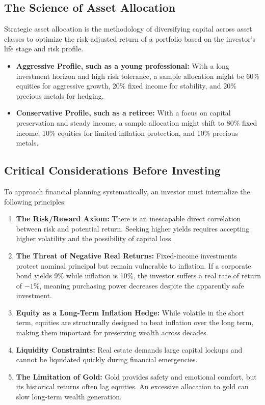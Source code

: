 \documentclass[12pt,openany]{book}
\begin{document}
\subsection{The Science of Asset Allocation}
Strategic asset allocation is the methodology of diversifying capital across asset classes to optimize the risk-adjusted return of a portfolio based on the investor's life stage and risk profile.

\begin{itemize}[leftmargin=*]
    \item \textbf{Aggressive Profile, such as a young professional:} With a long investment horizon and high risk tolerance, a sample allocation might be 60\% equities for aggressive growth, 20\% fixed income for stability, and 20\% precious metals for hedging.
    \item \textbf{Conservative Profile, such as a retiree:} With a focus on capital preservation and steady income, a sample allocation might shift to 80\% fixed income, 10\% equities for limited inflation protection, and 10\% precious metals.
\end{itemize}

\subsection{Critical Considerations Before Investing}
To approach financial planning systematically, an investor must internalize the following principles:

\begin{enumerate}[leftmargin=*]
    \item \textbf{The Risk/Reward Axiom:} There is an inescapable direct correlation between risk and potential return. Seeking higher yields requires accepting higher volatility and the possibility of capital loss.
    \item \textbf{The Threat of Negative Real Returns:} Fixed-income investments protect nominal principal but remain vulnerable to inflation. If a corporate bond yields 9\% while inflation is 10\%, the investor suffers a real rate of return of $-1\%$, meaning purchasing power decreases despite the apparently safe investment.
    \item \textbf{Equity as a Long-Term Inflation Hedge:} While volatile in the short term, equities are structurally designed to beat inflation over the long term, making them important for preserving wealth across decades.
    \item \textbf{Liquidity Constraints:} Real estate demands large capital lockups and cannot be liquidated quickly during financial emergencies.
    \item \textbf{The Limitation of Gold:} Gold provides safety and emotional comfort, but its historical returns often lag equities. An excessive allocation to gold can slow long-term wealth generation.
\end{enumerate}
\end{document}
